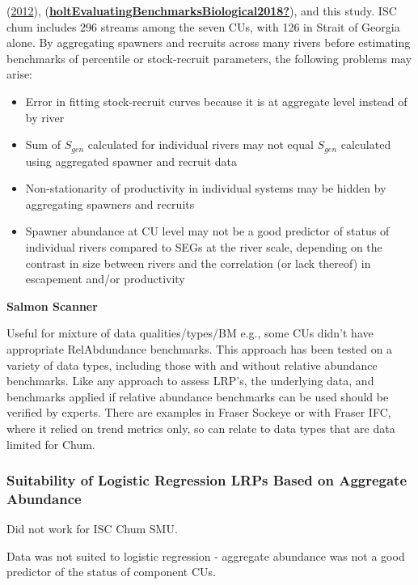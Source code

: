 \documentclass[11pt]{book}
\begin{document}
(\protect\hyperlink{ref-hilbornBritishColumbiaChum2012}{2012}), (\protect\hyperlink{ref-holtEvaluatingBenchmarksBiological2018}{\textbf{holtEvaluatingBenchmarksBiological2018?}}), and this study. ISC chum includes 296 streams among the seven CUs, with 126 in Strait of Georgia alone. By aggregating spawners and recruits across many rivers before estimating benchmarks of percentile or stock-recruit parameters, the following problems may arise:
\begin{itemize}

\item
  Error in fitting stock-recruit curves because it is at aggregate level instead of by river
\item
  Sum of \(S_{gen}\) calculated for individual rivers may not equal \(S_{gen}\) calculated using aggregated spawner and recruit data
\item
  Non-stationarity of productivity in individual systems may be hidden by aggregating spawners and recruits
\item
  Spawner abundance at CU level may not be a good predictor of status of individual rivers compared to SEGs at the river scale, depending on the contrast in size between rivers and the correlation (or lack thereof) in escapement and/or productivity
\end{itemize}
\textbf{Salmon Scanner}

Useful for mixture of data qualities/types/BM e.g., some CUs didn't have appropriate RelAbdundance benchmarks. This approach has been tested on a variety of data types, including those with and without relative abundance benchmarks. Like any approach to assess LRP's, the underlying data, and benchmarks applied if relative abundance benchmarks can be used should be verified by experts. There are examples in Fraser Sockeye or with Fraser IFC, where it relied on trend metrics only, so can relate to data types that are data limited for Chum.

\hypertarget{suitability-of-logistic-regression-lrps-based-on-aggregate-abundance}{%
\subsubsection{Suitability of Logistic Regression LRPs Based on Aggregate Abundance}\label{suitability-of-logistic-regression-lrps-based-on-aggregate-abundance}}

Did not work for ISC Chum SMU.

Data was not suited to logistic regression - aggregate abundance was not a good predictor of the status of component CUs.
\end{document}

